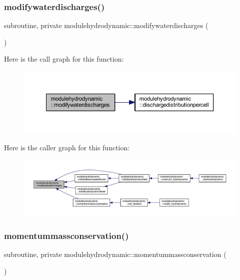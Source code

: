 \subsubsection{\texorpdfstring{modifywaterdischarges()}{modifywaterdischarges()}}
{\footnotesize\ttfamily subroutine, private modulehydrodynamic\+::modifywaterdischarges (\begin{DoxyParamCaption}{ }\end{DoxyParamCaption})\hspace{0.3cm}{\ttfamily [private]}}

Here is the call graph for this function\+:\nopagebreak
\begin{figure}[H]
\begin{center}
\leavevmode
\includegraphics[width=350pt]{namespacemodulehydrodynamic_a3efd394333f3dd01635ae28bbea6dd28_cgraph}
\end{center}
\end{figure}
Here is the caller graph for this function\+:\nopagebreak
\begin{figure}[H]
\begin{center}
\leavevmode
\includegraphics[width=350pt]{namespacemodulehydrodynamic_a3efd394333f3dd01635ae28bbea6dd28_icgraph}
\end{center}
\end{figure}
\mbox{\label{namespacemodulehydrodynamic_aa05a995dd1f1f6550d1ecdfb0a0bab47}} 
\subsubsection{\texorpdfstring{momentummassconservation()}{momentummassconservation()}}
{\footnotesize\ttfamily subroutine, private modulehydrodynamic\+::momentummassconservation (\begin{DoxyParamCaption}{ }\end{DoxyParamCaption})\hspace{0.3cm}{\ttfamily [private]}}

